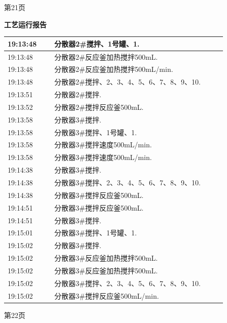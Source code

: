\documentclass[UTF8,10pt,a4paper,fontset=fandol]{ctexart}
\begin{document}
\begin{center}
\begin{minipage}[t]{0.47\linewidth}
\vspace{2mm}
{\tiny 第21页}
\end{minipage}
\hfill
\begin{minipage}[t]{0.47\linewidth}
\centering
\textbf{工艺运行报告}

\vspace{2mm}
\scriptsize
\begin{tabular}{|p{0.19\linewidth}|p{0.70\linewidth}|}
\hline
19:13:48 & 分散器2#搅拌、1号罐、1. \\ \hline
19:13:48 & 分散器2#反应釜加热搅拌500mL. \\ \hline
19:13:48 & 分散器2#反应釜加热搅拌500mL/min. \\ \hline
19:13:48 & 分散器2#搅拌、2、3、4、5、6、7、8、9、10. \\ \hline
19:13:51 & 分散器2#搅拌. \\ \hline
19:13:52 & 分散器2#搅拌反应釜500mL. \\ \hline
19:13:58 & 分散器3#搅拌. \\ \hline
19:13:58 & 分散器3#搅拌、1号罐、1. \\ \hline
19:13:58 & 分散器3#搅拌速度500mL/min. \\ \hline
19:13:58 & 分散器3#搅拌速度500mL/min. \\ \hline
19:14:38 & 分散器3#搅拌. \\ \hline
19:14:38 & 分散器3#搅拌、2、3、4、5、6、7、8、9、10. \\ \hline
19:14:38 & 分散器3#搅拌反应釜500mL. \\ \hline
19:14:51 & 分散器3#搅拌反应釜500mL. \\ \hline
19:14:51 & 分散器3#搅拌. \\ \hline
19:15:01 & 分散器3#搅拌、1号罐、1. \\ \hline
19:15:02 & 分散器3#搅拌. \\ \hline
19:15:02 & 分散器3#反应釜加热搅拌500mL. \\ \hline
19:15:02 & 分散器3#反应釜加热搅拌500mL. \\ \hline
19:15:02 & 分散器3#搅拌、2、3、4、5、6、7、8、9、10. \\ \hline
19:15:02 & 分散器3#搅拌反应釜500mL/min. \\ \hline
\end{tabular}

\vspace{2mm}
{\tiny 第22页}
\end{minipage}

\vspace{8mm}


\end{center}
\end{document}
